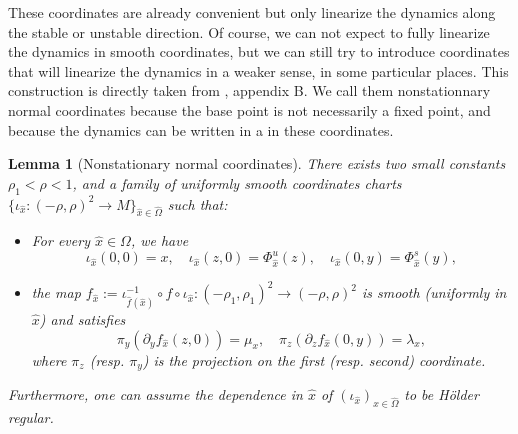 \documentclass[a4paper]{article}
\newtheorem{lemma}[theorem]{Lemma}
\theoremstyle{definition}
\begin{document}
These coordinates are already convenient but only linearize the dynamics along the stable or unstable direction. Of course, we can not expect to fully linearize the dynamics in smooth coordinates, but we can still try to introduce coordinates that will linearize the dynamics in a weaker sense, in some particular places. This construction is directly taken from \cite{TZ20}, appendix B. We call them nonstationnary normal coordinates because the base point is not necessarily a fixed point, and because the dynamics can be written in a  in these coordinates.

\begin{lemma}[Nonstationary normal coordinates]\label{lem:coordinates}
There exists two small constants $\rho_1 < \rho < 1$, and a family of uniformly smooth coordinates charts $\{ \iota_{\widehat{x}}:(-\rho,\rho)^2 \rightarrow M \}_{\widehat{x} \in \widehat{\Omega}}$ such that:
\begin{itemize}
\item For every $\widehat{x} \in \Omega$, we have $$ \iota_{\widehat{x}}(0,0) = x, \quad  \iota_{\widehat{x}}(z,0) = \Phi^u_{\widehat{x}}(z), \quad \iota_{\widehat{x}}(0,y) = \Phi_{\widehat{x}}^s(y) ,$$
\item the map $f_{\widehat{x}} := \iota_{\widehat{f}({\widehat{x}})}^{-1} \circ f \circ \iota_{\widehat{x}} : (-\rho_1,\rho_1)^2 \longrightarrow (-\rho,\rho)^2$ is smooth (uniformly in ${\widehat{x}}$) and satisfies
$$ \pi_y( \partial_y f_{\widehat{x}}(z,0)) = \mu_x , \quad \pi_z(\partial_z f_{\widehat{x}}(0,y)) = {\lambda}_x,$$
where $\pi_z$ (resp. $\pi_y$) is the projection on the first (resp. second) coordinate.
\end{itemize}
Furthermore, one can assume the dependence in ${\widehat{x}}$ of $(\iota_{\widehat{x}})_{{\widehat{x}} \in \widehat{\Omega}}$ to be Hölder regular.
\end{lemma}
\end{document}
